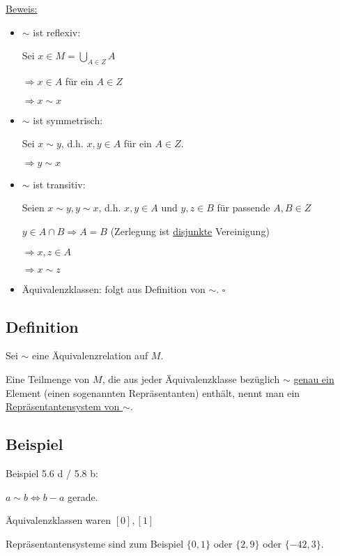 \documentclass[a4paper, 12pt, twoside] {article}
\begin{document}
\underline{Beweis:} 
\begin{itemize}
\item $\sim$ ist reflexiv:

Sei $x \in M = \displaystyle\bigcup_{A \in Z} A$

$\Rightarrow x \in A$ für ein $A \in Z$

$\Rightarrow x \sim x$

\item $\sim$ ist symmetrisch:

Sei $x \sim y$, d.h. $x,y \in A$ für ein $A \in Z$.

$\Rightarrow y \sim x$

\item $\sim$ ist transitiv:

Seien $x \sim y, y \sim x$, d.h. $x,y \in A$ und $y,z \in B$ für passende $A,B \in Z$

$y \in A \cap B \Rightarrow A = B$ (Zerlegung ist \underline{disjunkte} Vereinigung)

$\Rightarrow x,z \in A$

$\Rightarrow x \sim z$

\item Äquivalenzklassen: folgt aus Definition von $\sim$. \hfill $\square$
\end{itemize}

\subsection[Definition (Repräsentantensystem)]{Definition} %

Sei $\sim$ eine Äquivalenzrelation auf $M$.

Eine Teilmenge von $M$, die aus jeder Äquivalenzklasse bezüglich $\sim$ \underline{genau ein} Element (einen sogenannten Repräsentanten) enthält, nennt man ein \underline{Repräsentantensystem von $\sim$}.

\subsection{Beispiel} %

Beispiel 5.6 d / 5.8 b:

$a \sim b \Leftrightarrow b-a$ gerade.

Äquivalenzklassen waren $[0],[1]$

Repräsentantensysteme sind zum Beispiel $\{0,1\}$ oder $\{2,9\}$ oder $\{-42,3\}$.

\end{document}
